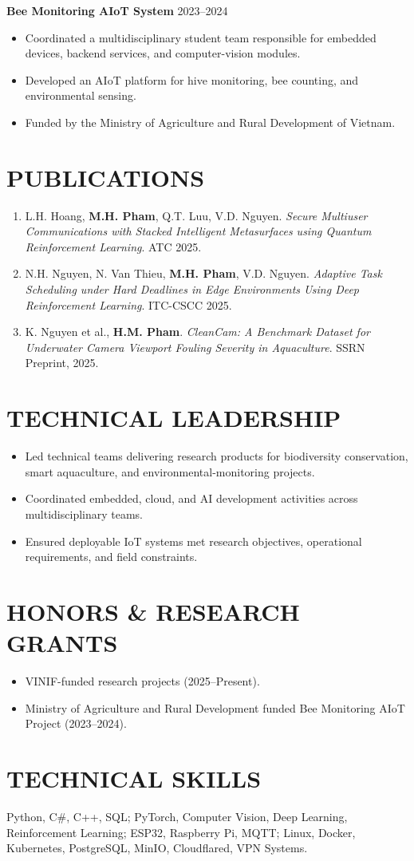\documentclass[letterpaper,11pt]{article}
\begin{document}
\textbf{Bee Monitoring AIoT System} \hfill 2023--2024
\begin{itemize}
\item Coordinated a multidisciplinary student team responsible for embedded devices, backend services, and computer-vision modules.
\item Developed an AIoT platform for hive monitoring, bee counting, and environmental sensing.
\item Funded by the Ministry of Agriculture and Rural Development of Vietnam.
\end{itemize}

\section{PUBLICATIONS}
\begin{enumerate}[leftmargin=*]
\item L.H. Hoang, \textbf{M.H. Pham}, Q.T. Luu, V.D. Nguyen. \emph{Secure Multiuser Communications with Stacked Intelligent Metasurfaces using Quantum Reinforcement Learning}. ATC 2025.
\item N.H. Nguyen, N. Van Thieu, \textbf{M.H. Pham}, V.D. Nguyen. \emph{Adaptive Task Scheduling under Hard Deadlines in Edge Environments Using Deep Reinforcement Learning}. ITC-CSCC 2025.
\item K. Nguyen et al., \textbf{H.M. Pham}. \emph{CleanCam: A Benchmark Dataset for Underwater Camera Viewport Fouling Severity in Aquaculture}. SSRN Preprint, 2025.
\end{enumerate}

\section{TECHNICAL LEADERSHIP}
\begin{itemize}
\item Led technical teams delivering research products for biodiversity conservation, smart aquaculture, and environmental-monitoring projects.
\item Coordinated embedded, cloud, and AI development activities across multidisciplinary teams.
\item Ensured deployable IoT systems met research objectives, operational requirements, and field constraints.
\end{itemize}

\section{HONORS \& RESEARCH GRANTS}
\begin{itemize}
\item VINIF-funded research projects (2025--Present).
\item Ministry of Agriculture and Rural Development funded Bee Monitoring AIoT Project (2023--2024).
\end{itemize}

\section{TECHNICAL SKILLS}
Python, C\#, C++, SQL; PyTorch, Computer Vision, Deep Learning, Reinforcement Learning; ESP32, Raspberry Pi, MQTT; Linux, Docker, Kubernetes, PostgreSQL, MinIO, Cloudflared, VPN Systems.
\end{document}

